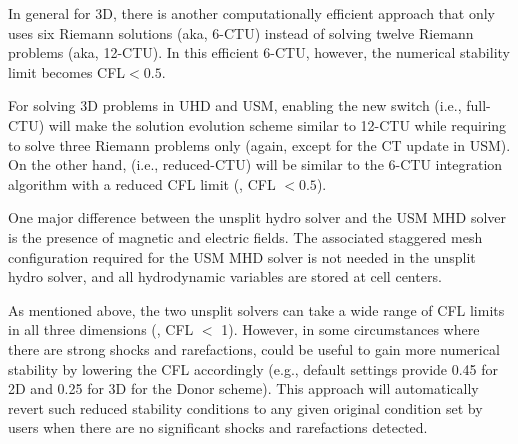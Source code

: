 \begin{itemize}
In general for 3D, there is another computationally efficient approach that only uses six Riemann solutions (aka, 6-CTU)
instead of solving twelve Riemann problems (aka, 12-CTU). In this efficient 6-CTU, however, 
the numerical stability limit becomes CFL$<0.5$. 

For solving 3D problems in UHD and USM, enabling the new switch  (i.e., full-CTU) will make 
the solution evolution scheme similar to 12-CTU while requiring to solve three Riemann problems only
(again, except for the CT update in USM). On the other hand,  (i.e., reduced-CTU) will be
similar to the 6-CTU integration algorithm with a reduced CFL limit (\ie, CFL $<0.5$).
\end{itemize}




\begin{flashtip}
One major difference between the unsplit hydro solver and the USM MHD solver 
is the presence of magnetic and electric fields. The associated
staggered mesh configuration required for the USM MHD solver is not needed
in the unsplit hydro solver, and all hydrodynamic variables are
stored at cell centers.
\end{flashtip}

\begin{flashtip}
As mentioned above, the two unsplit solvers can take a wide range of CFL limits in all three dimensions (\ie, CFL $<$ 1). 
However, in some circumstances where there are strong shocks and rarefactions,  could be useful to gain more numerical
stability by lowering the CFL accordingly 
(e.g., default settings provide 0.45 for 2D and 0.25 for 3D for the Donor scheme).
This approach will automatically revert such reduced 
stability conditions to any given original condition set by users when there are no significant shocks and rarefactions detected.
\end{flashtip}

